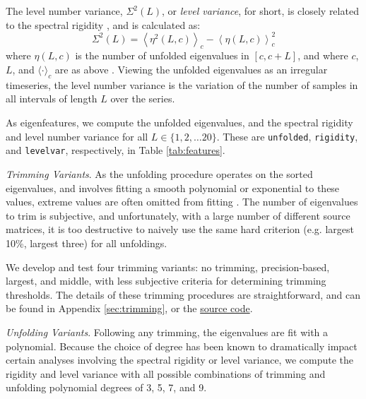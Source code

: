 \documentclass[12pt]{spieman}  %
\newcommand{\code}[1]{\small\texttt{#1}\normalsize}
\begin{document}
\begin{spacing}{2}
The level number variance, \(\Sigma^2(L)\), or \textit{level variance}, for short, is
closely related to the spectral rigidity \cite{mehtaRandomMatrices2004}, and is
calculated as:
\begin{equation}
\label{eq:levlvar}
\Sigma^2(L) = \left\langle \eta^2(L, c) \right\rangle_c - \left\langle \eta(L, c) \right\rangle^2_c
\end{equation}
where \(\eta(L, c)\) is the number of unfolded eigenvalues in \([c, c+ L]\),
and where \(c\), \(L\), and \(\langle \cdot \rangle_c\) are as above
\cite{guhrRandommatrixTheoriesQuantum1998a}. Viewing the unfolded eigenvalues
as an irregular timeseries, the level number variance is the
variation of the number of samples in all intervals of length \(L\) over the
series.

As eigenfeatures, we compute the unfolded eigenvalues, and the spectral
rigidity and level number variance for all \(L \in \{ 1, 2, \dots 20 \}\).
These are \code{unfolded}, \code{rigidity}, and \code{levelvar}, respectively,
in Table \ref{tab:features}.


\textit{Trimming Variants}. As the unfolding procedure operates on the sorted
eigenvalues, and involves fitting a smooth polynomial or exponential to these
values, extreme values are often omitted from fitting
\cite{moralesImprovedUnfoldingDetrending2011,
abueleninEffectUnfoldingSpectral2012}. The number of eigenvalues to trim is
subjective, and unfortunately, with a large number of different source
matrices, it is too destructive to naively use the same hard criterion (e.g.
largest 10\%, largest three) for all unfoldings.

We develop and test four trimming variants: no trimming, precision-based,
largest, and middle, with less subjective criteria for determining trimming
thresholds. The details of these trimming procedures are straightforward, and
can be found in Appendix \ref{sec:trimming}, or the
\href{https://github.com/DM-Berger/random-matrix-fmri/blob/7c9e4187f582dedee728cd7193b8894d928c2f00/code/rmt/updated_dataset.py#L431-L444}{source
code}.

\textit{Unfolding Variants}. Following any trimming, the eigenvalues are fit
with a polynomial. Because the choice of degree has been known to dramatically impact
certain analyses involving the spectral rigidity or level
variance\cite{abul-magdUnfoldingSpectrumChaotic2014,
moralesImprovedUnfoldingDetrending2011, abueleninSpectralUnfoldingChaotic2018,
fossionRandommatrixSpectraTime2013, abueleninEffectUnfoldingSpectral2012}, we
compute the rigidity and level variance with all possible combinations of
trimming and unfolding polynomial degrees of 3, 5, 7, and 9.


\end{spacing}
\end{document}
